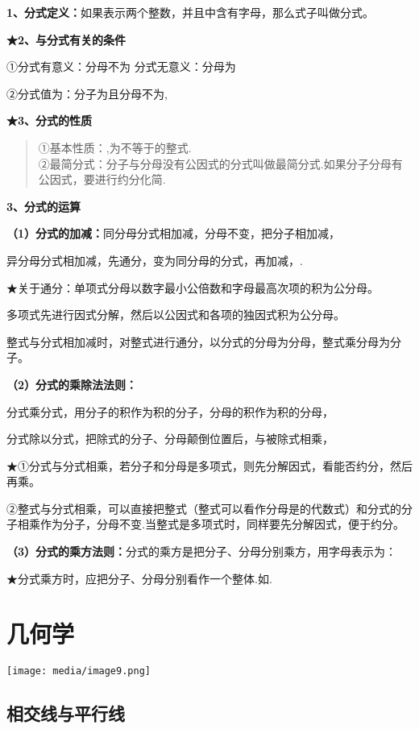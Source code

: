 \documentclass[a4paper,11pt,UTF8]{ctexart}
\begin{document}
\textbf{1、分式定义：}如果表示两个整数，并且中含有字母，那么式子叫做分式。

\textbf{★2、与分式有关的条件}

①分式有意义：分母不为 分式无意义：分母为

②分式值为：分子为且分母不为,

\textbf{★3、分式的性质}

\begin{quote}
①基本性质：,为不等于的整式.\\
②最简分式：分子与分母没有公因式的分式叫做最简分式.如果分子分母有公因式，要进行约分化简.
\end{quote}

\textbf{3、分式的运算}

\textbf{（1）分式的加减：}同分母分式相加减，分母不变，把分子相加减，

异分母分式相加减，先通分，变为同分母的分式，再加减，.

★关于通分：单项式分母以数字最小公倍数和字母最高次项的积为公分母。

多项式先进行因式分解，然后以公因式和各项的独因式积为公分母。

整式与分式相加减时，对整式进行通分，以分式的分母为分母，整式乘分母为分子。

\textbf{（2）分式的乘除法法则：}

分式乘分式，用分子的积作为积的分子，分母的积作为积的分母，

分式除以分式，把除式的分子、分母颠倒位置后，与被除式相乘，

★①分式与分式相乘，若分子和分母是多项式，则先分解因式，看能否约分，然后再乘。

②整式与分式相乘，可以直接把整式（整式可以看作分母是的代数式）和分式的分子相乘作为分子，分母不变.当整式是多项式时，同样要先分解因式，便于约分。

\textbf{（3）分式的乘方法则：}分式的乘方是把分子、分母分别乘方，用字母表示为：

★分式乘方时，应把分子、分母分别看作一个整体.如.

\hypertarget{ux51e0ux4f55ux5b66}{%
\section{\texorpdfstring{ 几何学}{ 几何学}}\label{ux51e0ux4f55ux5b66}}

\texttt{[image: media/image9.png]}

\hypertarget{ux76f8ux4ea4ux7ebfux4e0eux5e73ux884cux7ebf}{%
\subsection{\texorpdfstring{
相交线与平行线}{ 相交线与平行线}}\label{ux76f8ux4ea4ux7ebfux4e0eux5e73ux884cux7ebf}}
\end{document}
